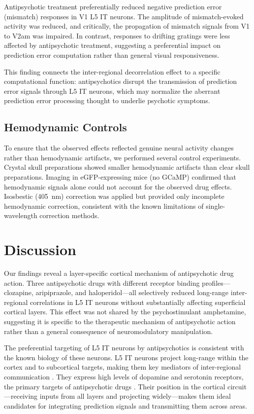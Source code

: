 \documentclass[11pt]{article}
\begin{document}
Antipsychotic treatment preferentially reduced negative prediction error (mismatch) responses in V1 L5 IT neurons. The amplitude of mismatch-evoked activity was reduced, and critically, the propagation of mismatch signals from V1 to V2am was impaired. In contrast, responses to drifting gratings were less affected by antipsychotic treatment, suggesting a preferential impact on prediction error computation rather than general visual responsiveness.

This finding connects the inter-regional decorrelation effect to a specific computational function: antipsychotics disrupt the transmission of prediction error signals through L5 IT neurons, which may normalize the aberrant prediction error processing thought to underlie psychotic symptoms.

\subsection{Hemodynamic Controls}

To ensure that the observed effects reflected genuine neural activity changes rather than hemodynamic artifacts, we performed several control experiments. Crystal skull preparations showed smaller hemodynamic artifacts than clear skull preparations. Imaging in eGFP-expressing mice (no GCaMP) confirmed that hemodynamic signals alone could not account for the observed drug effects. Isosbestic (405~nm) correction was applied but provided only incomplete hemodynamic correction, consistent with the known limitations of single-wavelength correction methods.

\section{Discussion}

Our findings reveal a layer-specific cortical mechanism of antipsychotic drug action. Three antipsychotic drugs with different receptor binding profiles---clozapine, aripiprazole, and haloperidol---all selectively reduced long-range inter-regional correlations in L5 IT neurons without substantially affecting superficial cortical layers. This effect was not shared by the psychostimulant amphetamine, suggesting it is specific to the therapeutic mechanism of antipsychotic action rather than a general consequence of neuromodulatory manipulation.

The preferential targeting of L5 IT neurons by antipsychotics is consistent with the known biology of these neurons. L5 IT neurons project long-range within the cortex and to subcortical targets, making them key mediators of inter-regional communication \citep{harris2019a,baker2018}. They express high levels of dopamine and serotonin receptors, the primary targets of antipsychotic drugs \citep{gaspar2009}. Their position in the cortical circuit---receiving inputs from all layers and projecting widely---makes them ideal candidates for integrating prediction signals and transmitting them across areas.
\end{document}
